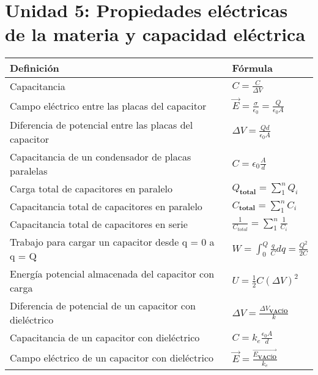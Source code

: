 \documentclass[a4paper,12pt]{article}
\begin{document}
	\section{Unidad 5: Propiedades eléctricas de la materia y capacidad eléctrica}
	\renewcommand{\arraystretch}{1.5}
	\begin{center}
		\begin{tabularx}{\textwidth}{|X|X|}
			\hline
			\textbf{Definición} & \textbf{Fórmula} \\ \hline
			Capacitancia & $C = \frac{C}{\Delta V}$ \\ \hline
			Campo eléctrico entre las placas del capacitor & $\vec{E} = \frac{\sigma}{\epsilon_0} = \frac{Q}{{\epsilon_0}A}$ \\ \hline
			Diferencia de potencial entre las placas del capacitor & $\Delta V = \frac{Qd}{{\epsilon_0}A}$ \\ \hline
			Capacitancia de un condensador de placas paralelas & $C = {\epsilon_0}{\frac{A}{d}}$ \\ \hline
			Carga total de capacitores en paralelo & ${Q_{\textbf{total}}} = \sum_{1}^{n} {Q_i}$ \\ \hline
			Capacitancia total de capacitores en paralelo & ${C_{\textbf{total}}} = \sum_{1}^{n} {C_i}$ \\ \hline
			Capacitancia total de capacitores en serie & ${\frac{1}{C_{total}}} = \sum_{1}^{n} {\frac{1}{C_i}}$ \\ \hline
			Trabajo para cargar un capacitor desde q = 0 a q = Q & $W = \int_{0}^{Q} \frac{q}{C}dq = \frac{Q^2}{2C}$ \\ \hline
			Energía potencial almacenada del capacitor con carga & $U = \frac{1}{2} C{(\Delta V)^2}$ \\ \hline
			Diferencia de potencial de un capacitor con dieléctrico & $\Delta V = \frac{\Delta {V_{\textbf{VACÍO}}}}{k}$ \\ \hline
			Capacitancia de un capacitor con dieléctrico & $C = {k_e}{\frac{\epsilon_0 A}{d}}$ \\ \hline
			Campo eléctrico de un capacitor con dieléctrico & $\vec{E} = \frac{\vec{E_{\textbf{VACÍO}}}}{k_e}$ \\ \hline
			\end{tabularx}
	\end{center}
\end{document}
